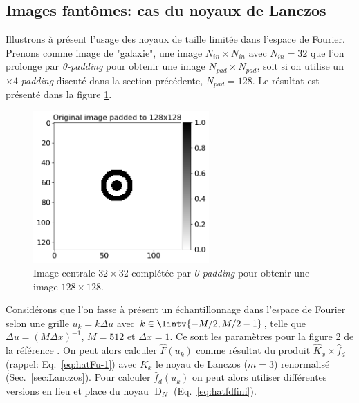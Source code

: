 \documentclass[11pt,twoside]{article}
\DeclareMathOperator{\D}{D}
\begin{document}
\subsection{Images fantômes: cas du noyaux de Lanczos}
%
Illustrons à présent l'usage des noyaux de taille limitée dans l'espace de Fourier. Prenons comme image de "galaxie", une image $N_{in}\times N_{in}$ avec $N_{in}=32$  que l'on prolonge  par \textit{0-padding} pour obtenir une image  $N_{pad}\times N_{pad}$, soit si on utilise un $\times 4$ \textit{padding} discuté dans la section précédente, $N_{pad}=128$. Le résultat est présenté dans la figure \ref{fig-128padded-init-image}.
\begin{figure}
\centering
\includegraphics[width=0.6\textwidth]{fig19.png}
\caption{Image centrale $32\times 32$ complétée par \textit{0-padding} pour obtenir une image $128\times 128$.}
\label{fig-128padded-init-image}
\end{figure}

Considérons que l'on fasse à présent un échantillonnage dans l'espace de Fourier selon une grille $u_k = k \Delta u$ avec $k\in\Iintv{-M/2,M/2-1}$, telle que $\Delta u = (M \Delta x)^{-1}$, $M=512$ et $\Delta x=1$. Ce sont les paramètres pour la figure 2 de la référence \cite{2014PASP..126..287B}. On peut alors calculer $\hat{F}(u_k)$ comme résultat du produit $\hat{K}_x \times \hat{f}_d$ (rappel:  Eq.~\ref{eq:hatFu-1}) avec $K_x$ le noyau de Lanczos ($m=3$) renormalisé (Sec.~\ref{sec:Lanczos}). Pour calculer $\hat{f}_d(u_k)$ on peut alors utiliser différentes versions en lieu et place du noyau $\D_N$ (Eq.~\ref{eq:hatfdfini}).
\end{document}
